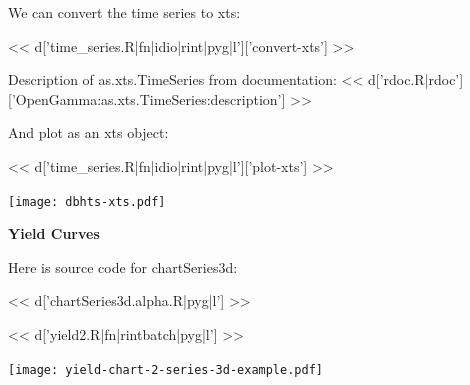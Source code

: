 \documentclass[custom, plainsections]{sciposter}
\begin{document}
\begin{multicols*}{2}
We can convert the time series to xts:

<< d['time_series.R|fn|idio|rint|pyg|l']['convert-xts'] >>

Description of as.xts.TimeSeries from documentation: << d['rdoc.R|rdoc']['OpenGamma:as.xts.TimeSeries:description'] >>

And plot as an xts object:

<< d['time_series.R|fn|idio|rint|pyg|l']['plot-xts'] >>

\texttt{[image: dbhts-xts.pdf]}

\pagebreak

\textbf{Yield Curves}

Here is source code for chartSeries3d:

<< d['chartSeries3d.alpha.R|pyg|l'] >>

<< d['yield2.R|fn|rintbatch|pyg|l'] >>

\texttt{[image: yield-chart-2-series-3d-example.pdf]}

\end{multicols*}

\pagebreak
\end{document}
